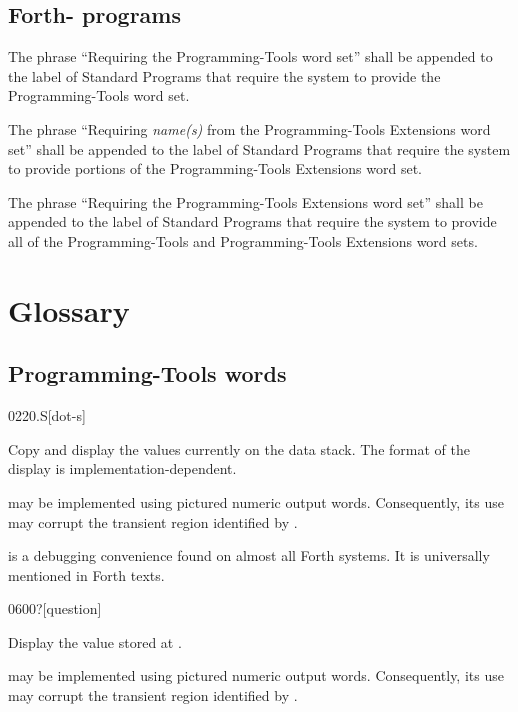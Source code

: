 \subsection{Forth-\snapshot{} programs} %

The phrase ``Requiring the Programming-Tools word set'' shall be
appended to the label of Standard Programs that require the system
to provide the Programming-Tools word set.

The phrase ``Requiring \emph{name(s)} from the Programming-Tools
Extensions word set'' shall be appended to the label of Standard
Programs that require the system to provide portions of the
Programming-Tools Extensions word set.

The phrase ``Requiring the Programming-Tools Extensions word set''
shall be appended to the label of Standard Programs that require the
system to provide all of the Programming-Tools and Programming-Tools
Extensions word sets.



\section{Glossary} %

\subsection{Programming-Tools words} %

\begin{worddef}{0220}{.S}[dot-s]
\item \stack{}{}

	Copy and display the values currently on the data stack. The
	format of the display is implementation-dependent.

	 may be implemented using pictured numeric output words.
	Consequently, its use may corrupt the transient region identified
	by .


	\begin{rationale} %
		 is a debugging convenience found on almost
		all Forth systems. It is universally mentioned in Forth texts.
	\end{rationale}
\end{worddef}


\begin{worddef}[q]{0600}{?}[question]
\item {}

	Display the value stored at .

	 may be implemented using pictured numeric output words.
	Consequently, its use may corrupt the transient region identified
	by .

\end{worddef}

